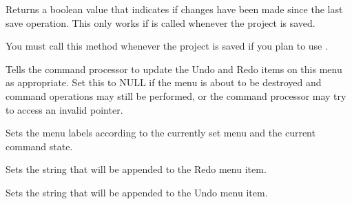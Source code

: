 \label{wxcommandprocessorisdirty}


Returns a boolean value that indicates if changes have been made since
the last save operation. This only works if 
is called whenever the project is saved.


\label{wxcommandprocessormarkassaved}


You must call this method whenever the project is saved if you plan to use 
.


\label{wxcommandprocessorseteditmenu}


Tells the command processor to update the Undo and Redo items on this
menu as appropriate. Set this to NULL if the menu is about to be
destroyed and command operations may still be performed, or the command
processor may try to access an invalid pointer.


\label{wxcommandprocessorsetmenustrings}


Sets the menu labels according to the currently set menu and the current
command state.


\label{wxcommandprocessorsetredoaccelerator}


Sets the string that will be appended to the Redo menu item.


\label{wxcommandprocessorsetundoaccelerator}


Sets the string that will be appended to the Undo menu item.


\label{wxcommandprocessorsubmit}


